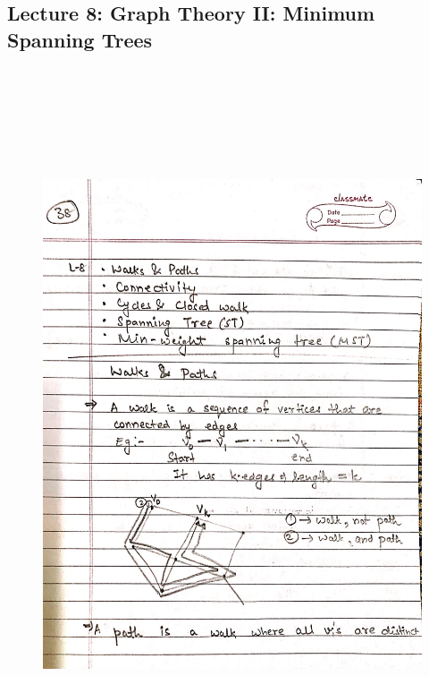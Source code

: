 \newpage
{\color{black} \subsection*{Lecture 8: Graph Theory II: Minimum Spanning Trees}}
\begin{figure}[H]
    \centering
    \includegraphics[width=16cm, height=21cm]{"./MIT-6.042J/MIT-6042J-038"}
\end{figure}

